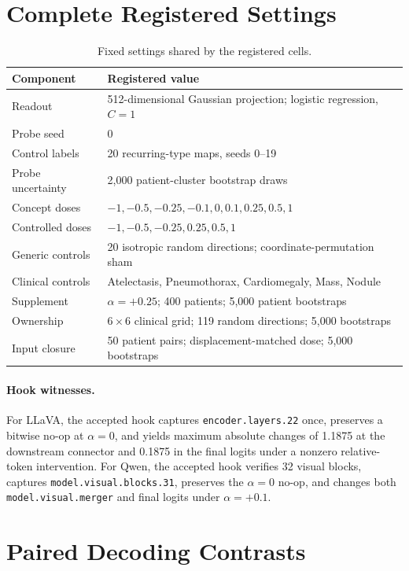 \section{Complete Registered Settings}

\begin{table}[h]
\centering
\small
\caption{Fixed settings shared by the registered cells.}
\begin{tabular}{ll}
\toprule
Component & Registered value \\
\midrule
Readout & 512-dimensional Gaussian projection; logistic regression, $C=1$ \\
Probe seed & 0 \\
Control labels & 20 recurring-type maps, seeds 0--19 \\
Probe uncertainty & 2,000 patient-cluster bootstrap draws \\
Concept doses & $-1,-0.5,-0.25,-0.1,0,0.1,0.25,0.5,1$ \\
Controlled doses & $-1,-0.5,-0.25,0.25,0.5,1$ \\
Generic controls & 20 isotropic random directions; coordinate-permutation sham \\
Clinical controls & Atelectasis, Pneumothorax, Cardiomegaly, Mass, Nodule \\
Supplement & $\alpha=+0.25$; 400 patients; 5,000 patient bootstraps \\
Ownership & $6\times6$ clinical grid; 119 random directions; 5,000 bootstraps \\
Input closure & 50 patient pairs; displacement-matched dose; 5,000 bootstraps \\
\bottomrule
\end{tabular}
\end{table}

\paragraph{Hook witnesses.}
For LLaVA, the accepted hook captures \texttt{encoder.layers.22} once, preserves a bitwise no-op at $\alpha=0$, and yields maximum absolute changes of 1.1875 at the downstream connector and 0.1875 in the final logits under a nonzero relative-token intervention. For Qwen, the accepted hook verifies 32 visual blocks, captures \texttt{model.visual.blocks.31}, preserves the $\alpha=0$ no-op, and changes both \texttt{model.visual.merger} and final logits under $\alpha=+0.1$.

\section{Paired Decoding Contrasts}

